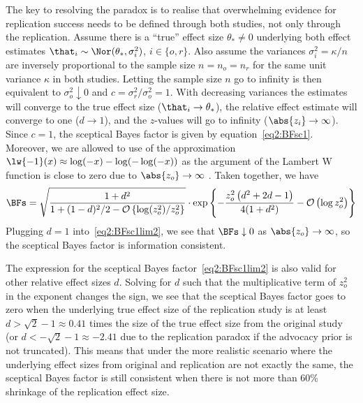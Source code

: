 The key to resolving the paradox is to realise that overwhelming evidence for
replication success needs to be defined through both studies, not only through
the replication. Assume there is a ``true'' effect size $\theta_{*} \neq 0$
underlying both effect estimates
$\that_{i} \sim \Nor(\theta_{*}, \sigma_{i}^{2})$, $i \in \{o, r\}$. Also assume
the variances $\sigma_{i}^{2} = \kappa/n$ are inversely proportional to the
sample size \mbox{$n = n_{o} = n_{r}$} for the same unit variance $\kappa$ in
both studies. Letting the sample size $n$ go to infinity is then equivalent to
$\sigma_{o}^{2} \downarrow 0$ and $c = \sigma^{2}_{r}/\sigma^{2}_{o} = 1$. With
decreasing variances the estimates will converge to the true effect size
($\that_{i} \to \theta_{*}$), the relative effect estimate will converge to one
($d \to 1$), and the $z$-values will go to infinity ($\abs{z_{i}} \to \infty$).
Since $c = 1$, the sceptical Bayes factor is given by
equation~\eqref{eq2:BFsc1}. Moreover, we are allowed to use of the approximation
\mbox{$\lw{-1}(x) \approx \log(-x) - \log(-\log(-x))$} as the argument of the
Lambert W function is close to zero due to $\abs{z_{o}} \to \infty$ \citep[p.
350]{Corless1996}. Taken together, we have
\begin{align}
  \label{eq2:BFsc1lim2}
  \BFs =
  \sqrt{\frac{1 + d^{2}}{1 + (1 - d)^{2}/2 -
\mathcal{O}\left\{\log(z_{o}^{2})/z_{o}^{2}\right\}}} \cdot
  \exp\left\{-\frac{z_o^2\left(d^{2} + 2d - 1 \right)}{4(1 + d^{2})}
- \mathcal{O}\left(\log z_{o}^{2}\right)\right\}
\end{align}
Plugging $d = 1$ into~\eqref{eq2:BFsc1lim2}, we see that $\BFs \downarrow 0$ as
$\abs{z_{o}} \to \infty$, so the sceptical Bayes factor is information
consistent.

The expression for the sceptical Bayes factor~\eqref{eq2:BFsc1lim2} is also valid
for other relative effect sizes $d$. Solving for $d$ such that the
multiplicative term of $z_{o}^{2}$ in the exponent changes the sign, we see that
the sceptical Bayes factor goes to zero when the underlying true effect size of
the replication study is at least
$d > \sqrt{2} - 1 \approx 0.41$ times the size of the
true effect size from the original study (or
$d < -\sqrt{2} - 1 \approx -2.41$ due to the
replication paradox if the advocacy prior is not truncated). This means that
under the more realistic scenario where the underlying effect sizes from
original and replication are not exactly the same, the sceptical Bayes factor is
still consistent when there is not more than 60\% shrinkage of the replication
effect size.


